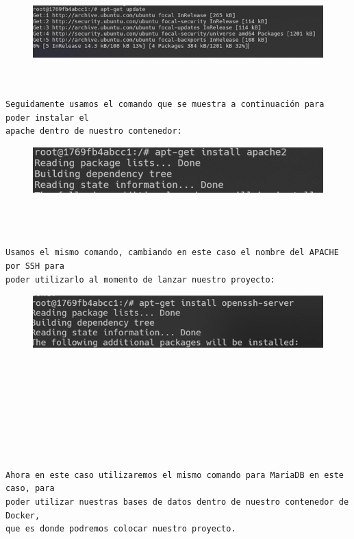 \documentclass{article}
\begin{document}
\begin{figure}[h]
    \centering
    \includegraphics[width=1\textwidth]{img/2.png}
    \label{fig:imagen}
\end{figure}


\begin{flushleft}
\begin{verbatim}


Seguidamente usamos el comando que se muestra a continuación para poder instalar el
apache dentro de nuestro contenedor:
\end{verbatim}
\end{flushleft}

\begin{figure}[h]
    \centering
    \includegraphics[width=1\textwidth]{img/3.png}
    \label{fig:imagen}
\end{figure}



\begin{flushleft}
\begin{verbatim}



Usamos el mismo comando, cambiando en este caso el nombre del APACHE por SSH para 
poder utilizarlo al momento de lanzar nuestro proyecto:
\end{verbatim}
\end{flushleft}

\begin{figure}[h]
    \centering
    \includegraphics[width=1\textwidth]{img/4.png}
    \label{fig:imagen}
\end{figure}

\begin{flushleft}
\begin{verbatim}








Ahora en este caso utilizaremos el mismo comando para MariaDB en este caso, para 
poder utilizar nuestras bases de datos dentro de nuestro contenedor de Docker, 
que es donde podremos colocar nuestro proyecto.
\end{verbatim}
\end{flushleft}
\end{document}

